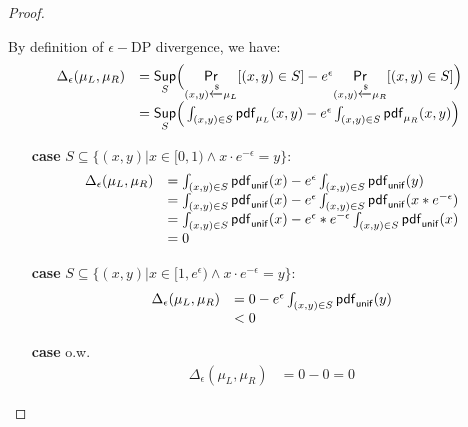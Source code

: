 \documentclass{article}
\begin{document}
\begin{proof}
\begin{itemize}
	By definition of $\epsilon-$DP divergence, we have:
	 \[
	 \begin{array}{ll}
	 \Delta_{\epsilon}(\mu_L, \mu_R) 
	 & = \underset{S}{\mathsf{Sup}}
	 \Big(
	 \underset{(x,y) \xleftarrow{\$} \mu_L}{\mathsf{Pr}}[(x,y) \in S] - e^{\epsilon} \underset{(x,y) \xleftarrow{\$} \mu_R}{\mathsf{Pr}}[(x,y) \in S]
	 \Big) \\
	 & =\underset{S}{\mathsf{Sup}}
	 \Big(
	 \int_{(x,y) \in S} \mathsf{pdf}_{\mu_L}(x, y) - e^{\epsilon} \int_{(x,y) \in S} \mathsf{pdf}_{\mu_R}(x, y)
	 \Big)	 
	 \end{array}
	 \]
	 \begin{itemize}
	 	\item[{\bf case}] $S \subseteq \{(x, y) | x \in [0, 1) \land x \cdot e^{-\epsilon} = y\}$:\\
		 \[
		 \begin{array}{ll}
		 \Delta_{\epsilon}(\mu_L, \mu_R) 
		 & = 
		 \int_{(x,y) \in S} \mathsf{pdf}_{\mathsf{unif}}(x) - e^{\epsilon} \int_{(x,y) \in S} \mathsf{pdf}_{\mathsf{unif}}(y)\\
		 & = 
		 \int_{(x,y) \in S} \mathsf{pdf}_{\mathsf{unif}}(x) - e^{\epsilon} \int_{(x,y) \in S} \mathsf{pdf}_{\mathsf{unif}}(x * e^{-\epsilon})\\ 
		 & = 
		 \int_{(x,y) \in S} \mathsf{pdf}_{\mathsf{unif}}(x) - e^{\epsilon}* e^{-\epsilon} \int_{(x,y) \in S} \mathsf{pdf}_{\mathsf{unif}}(x )\\
		 & = 0 
		 \end{array}
		 \]
	 	\item[{\bf case}] $S \subseteq \{(x, y) | x \in [1, e^{\epsilon}) \land x \cdot e^{-\epsilon} = y\}$:\\
		 \[
		 \begin{array}{ll}
		 \Delta_{\epsilon}(\mu_L, \mu_R) 
		 & = 
		 0 - e^{\epsilon} \int_{(x,y) \in S} \mathsf{pdf}_{\mathsf{unif}}(y)\\
		 & <  0 
		 \end{array}
		 \]
	 	\item[{\bf case}] o.w.\\
		 \[
		 \begin{array}{ll}
		 \Delta_{\epsilon}(\mu_L, \mu_R) 
		 & = 0 - 0 =  0 
		 \end{array}
		 \]	 	

	 \end{itemize}

\end{itemize}
\end{proof}
\newpage


\end{document}
